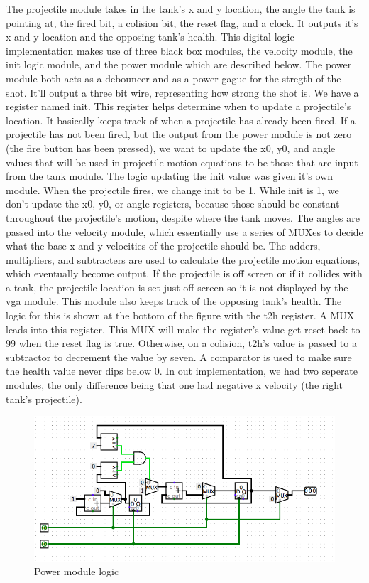 \documentclass{article}
\begin{document}
The projectile module takes in the tank's x and y location, the angle the tank is pointing at, the fired bit, a colision bit, the reset flag, and a clock. It outputs it's x and y location and the opposing tank's health. This digital logic implementation makes use of three black box modules, the velocity module, the init logic module, and the power module which are described below. The power module both acts as a debouncer and as a power gague for the stregth of the shot. It'll output a three bit wire, representing how strong the shot is. We have a register named init. This register helps determine when to update a projectile's location. It basically keeps track of when a projectile has already been fired. If a projectile has not been fired, but the output from the power module is not zero (the fire button has been pressed), we want to update the x0, y0, and angle values that will be used in projectile motion equations to be those that are input from the tank module. The logic updating the init value was given it's own module. When the projectile fires, we change init to be 1. While init is 1, we don't update the x0, y0, or angle registers, because those should be constant throughout the projectile's motion, despite where the tank moves. The angles are passed into the velocity module, which essentially use a series of MUXes to decide what the base x and y velocities of the projectile should be. The adders, multipliers, and subtracters are used to calculate the projectile motion equations, which eventually become output. If the projectile is off screen or if it collides with a tank, the projectile location is set just off screen so it is not displayed by the vga module. This module also keeps track of the opposing tank's health. The logic for this is shown at the bottom of the figure with the t2h register. A MUX leads into this register. This MUX will make the register's value get reset back to 99 when the reset flag is true. Otherwise, on a colision, t2h's value is passed to a subtractor to decrement the value by seven. A comparator is used to make sure the health value never dips below 0. In out implementation, we had two seperate modules, the only difference being that one had negative x velocity (the right tank's projectile).

\begin{figure}[H]
	\begin{center}
		\includegraphics[width=1\textwidth]{power.png} 
		\caption{Power module logic}
	\end{center}
\end{figure}
\end{document}

